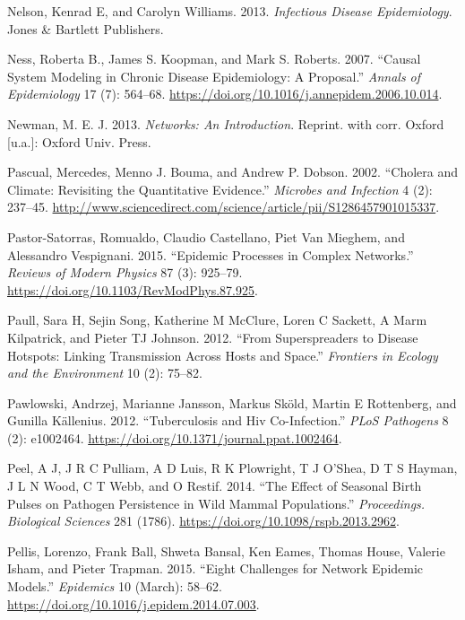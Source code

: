 \documentclass[
]{book}
\begin{document}
\leavevmode\hypertarget{ref-nelson13}{}%
Nelson, Kenrad E, and Carolyn Williams. 2013. \emph{Infectious Disease Epidemiology}. Jones \& Bartlett Publishers.

\leavevmode\hypertarget{ref-ness07}{}%
Ness, Roberta B., James S. Koopman, and Mark S. Roberts. 2007. ``Causal System Modeling in Chronic Disease Epidemiology: A Proposal.'' \emph{Annals of Epidemiology} 17 (7): 564--68. \url{https://doi.org/10.1016/j.annepidem.2006.10.014}.

\leavevmode\hypertarget{ref-newman13}{}%
Newman, M. E. J. 2013. \emph{Networks: An Introduction}. Reprint. with corr. Oxford {[}u.a.{]}: Oxford Univ. Press.

\leavevmode\hypertarget{ref-pascual02}{}%
Pascual, Mercedes, Menno J. Bouma, and Andrew P. Dobson. 2002. ``Cholera and Climate: Revisiting the Quantitative Evidence.'' \emph{Microbes and Infection} 4 (2): 237--45. \url{http://www.sciencedirect.com/science/article/pii/S1286457901015337}.

\leavevmode\hypertarget{ref-pastor-satorras15}{}%
Pastor-Satorras, Romualdo, Claudio Castellano, Piet Van Mieghem, and Alessandro Vespignani. 2015. ``Epidemic Processes in Complex Networks.'' \emph{Reviews of Modern Physics} 87 (3): 925--79. \url{https://doi.org/10.1103/RevModPhys.87.925}.

\leavevmode\hypertarget{ref-paull12}{}%
Paull, Sara H, Sejin Song, Katherine M McClure, Loren C Sackett, A Marm Kilpatrick, and Pieter TJ Johnson. 2012. ``From Superspreaders to Disease Hotspots: Linking Transmission Across Hosts and Space.'' \emph{Frontiers in Ecology and the Environment} 10 (2): 75--82.

\leavevmode\hypertarget{ref-pawlowski12}{}%
Pawlowski, Andrzej, Marianne Jansson, Markus Sköld, Martin E Rottenberg, and Gunilla Källenius. 2012. ``Tuberculosis and Hiv Co-Infection.'' \emph{PLoS Pathogens} 8 (2): e1002464. \url{https://doi.org/10.1371/journal.ppat.1002464}.

\leavevmode\hypertarget{ref-peel14}{}%
Peel, A J, J R C Pulliam, A D Luis, R K Plowright, T J O'Shea, D T S Hayman, J L N Wood, C T Webb, and O Restif. 2014. ``The Effect of Seasonal Birth Pulses on Pathogen Persistence in Wild Mammal Populations.'' \emph{Proceedings. Biological Sciences} 281 (1786). \url{https://doi.org/10.1098/rspb.2013.2962}.

\leavevmode\hypertarget{ref-pellis15}{}%
Pellis, Lorenzo, Frank Ball, Shweta Bansal, Ken Eames, Thomas House, Valerie Isham, and Pieter Trapman. 2015. ``Eight Challenges for Network Epidemic Models.'' \emph{Epidemics} 10 (March): 58--62. \url{https://doi.org/10.1016/j.epidem.2014.07.003}.
\end{document}
